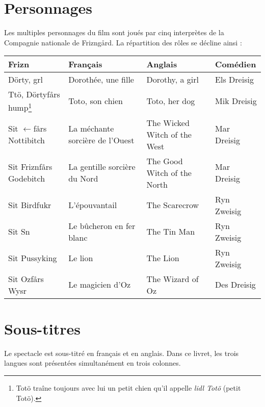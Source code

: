 \section*{Personnages}
Les multiples personnages du film sont joués par cinq interprètes de la
Compagnie nationale de Frizngård. La répartition des
rôles se décline ainsi :
\begin{longtable}{p{2.7cm}|p{2.7cm}|p{2.7cm}|p{2.7cm}}
Frizn & Français & Anglais & Comédien\\\hline
Dörty, grl & Dorothée, une fille & Dorothy, a girl & Els Dreisig\\\hdashline
Ttö, Dörtyfårs hump\footnote{Totö traîne toujours avec lui un petit chien
qu'il appelle \og{}\emph{lidl Totö}\fg{} (petit Totö).} & Toto, son chien & Toto, her dog & Mik Dreisig\\\hdashline
Sit $\leftarrow$fårs Nottibitch & La méchante sorcière de l'Ouest & The Wicked Witch of the West &
Mar Dreisig \\\hdashline
Sit Friznfårs Godebitch & La gentille sorcière
du Nord & The Good Witch of the North &
Mar Dreisig \\\hdashline
Sit Birdfukr & L'épouvantail & The Scarecrow & Ryn Zweisig \\\hdashline
Sit Sn & Le bûcheron en fer blanc & The Tin Man & Ryn Zweisig \\\hdashline
Sit Pussyking & Le lion & The Lion & Ryn Zweisig \\\hdashline
Sit Ozfårs Wysr & Le magicien d'Oz & The Wizard of Oz & Des Dreisig \\
\end{longtable}
\section*{Sous-titres}
Le spectacle est sous-titré en français et en anglais. Dans ce livret, les
trois langues sont présentées simultanément en trois colonnes.